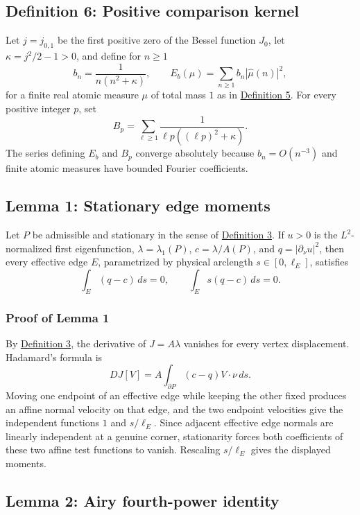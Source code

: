 \documentclass[11pt]{article}
\begin{document}
\subsection{Definition 6: Positive comparison
kernel}\label{def-positive-kernel}

Let \(j=j_{0,1}\) be the first positive zero of the Bessel function
\(J_0\), let \(\kappa=j^2/2-1>0\), and define for \(n\ge1\) \[
b_n=\frac1{n(n^2+\kappa)},\qquad
E_b(\mu)=\sum_{n\ge1}b_n|\widehat\mu(n)|^2,
\] for a finite real atomic measure \(\mu\) of total mass \(1\) as in
\hyperref[def-turn-measure]{Definition 5}. For every positive integer
\(p\), set \[
B_p=\sum_{\ell\ge1}\frac1{\ell p((\ell p)^2+\kappa)}.
\] The series defining \(E_b\) and \(B_p\) converge absolutely because
\(b_n=O(n^{-3})\) and finite atomic measures have bounded Fourier
coefficients.

\subsection{Lemma 1: Stationary edge moments}\label{lem-edge-moments}

Let \(P\) be admissible and stationary in the sense of
\hyperref[def-stationary-polygon]{Definition 3}. If \(u>0\) is the
\(L^2\)-normalized first eigenfunction, \(\lambda=\lambda_1(P)\),
\(c=\lambda/A(P)\), and \(q=|\partial_\nu u|^2\), then every effective
edge \(E\), parametrized by physical arclength \(s\in[0,\ell_E]\),
satisfies \[
\int_E(q-c)\,ds=0,\qquad \int_Es(q-c)\,ds=0.
\]

\subsubsection{Proof of Lemma 1}\label{proof-lem-edge-moments}

By \hyperref[def-stationary-polygon]{Definition 3}, the derivative of
\(J=A\lambda\) vanishes for every vertex displacement. Hadamard's
formula is \[
DJ[V]=A\int_{\partial P}(c-q)V\cdot\nu\,ds.
\] Moving one endpoint of an effective edge while keeping the other
fixed produces an affine normal velocity on that edge, and the two
endpoint velocities give the independent functions \(1\) and
\(s/\ell_E\). Since adjacent effective edge normals are linearly
independent at a genuine corner, stationarity forces both coefficients
of these two affine test functions to vanish. Rescaling \(s/\ell_E\)
gives the displayed moments.

\subsection{Lemma 2: Airy fourth-power
identity}\label{lem-airy-identity}
\end{document}

